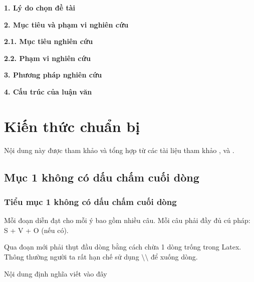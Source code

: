 \documentclass[a4paper,oneside]{thesis}
\begin{document}
\newpage
{}
\listoftables %


\vskip2cm






\newpage


\lmd
\textbf{1. Lý do chọn đề tài}



\textbf{2. Mục tiêu và phạm vi nghiên cứu}

\textbf{2.1. Mục tiêu nghiên cứu}

\textbf{2.2. Phạm vi nghiên cứu}

\textbf{3. Phương pháp nghiên cứu}



\textbf{4. Cấu trúc của luận văn}



\hspace{.5cm} 
\chapter{Kiến thức chuẩn bị}
\setcounter{page}{1}
Nội dung này được tham khảo và tổng hợp từ các tài liệu tham khảo \cite{1}, \cite{2} và \cite{5}. 


\section{Mục 1 không có dấu chấm cuối dòng}
\subsection{Tiểu mục 1 không có dấu chấm cuối dòng}

Mỗi đoạn diễn đạt cho mỗi ý bao gồm nhiều câu. Mỗi câu phải đầy đủ cú pháp: S + V + O (nếu có).

Qua đoạn mới phải thụt đầu dòng bằng cách chừa 1 dòng trống trong Latex. Thông thường người ta rất hạn chế sử dụng $\setminus\setminus$ để xuống dòng. 
\begin{dn}
 Nội dung định nghĩa viết vào đây
\end{dn}
\end{document}
